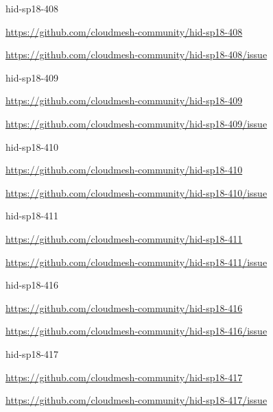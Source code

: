 \begin{IU}

hid-sp18-408

\url{https://github.com/cloudmesh-community/hid-sp18-408}

\url{https://github.com/cloudmesh-community/hid-sp18-408/issue}

\end{IU}


\begin{IU}

hid-sp18-409

\url{https://github.com/cloudmesh-community/hid-sp18-409}

\url{https://github.com/cloudmesh-community/hid-sp18-409/issue}

\end{IU}


\begin{IU}

hid-sp18-410

\url{https://github.com/cloudmesh-community/hid-sp18-410}

\url{https://github.com/cloudmesh-community/hid-sp18-410/issue}

\end{IU}


\begin{IU}

hid-sp18-411

\url{https://github.com/cloudmesh-community/hid-sp18-411}

\url{https://github.com/cloudmesh-community/hid-sp18-411/issue}

\end{IU}


\begin{IU}

hid-sp18-416

\url{https://github.com/cloudmesh-community/hid-sp18-416}

\url{https://github.com/cloudmesh-community/hid-sp18-416/issue}

\end{IU}


\begin{IU}

hid-sp18-417

\url{https://github.com/cloudmesh-community/hid-sp18-417}

\url{https://github.com/cloudmesh-community/hid-sp18-417/issue}

\end{IU}


